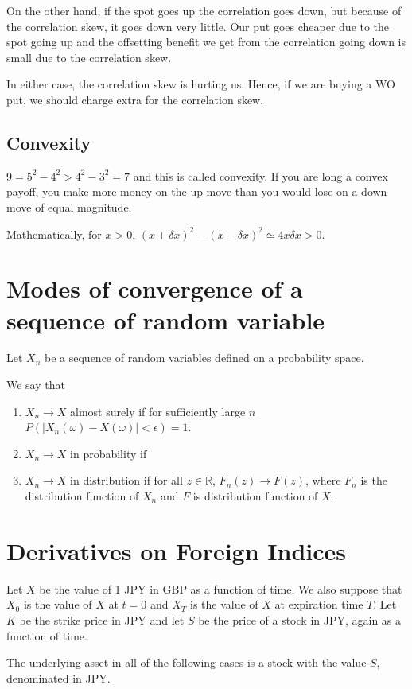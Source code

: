\documentclass{amsart}
\theoremstyle{plain}
\numberwithin{equation}{section}
\begin{document}
On the other hand, if the spot goes up the correlation 
goes down, but because of the correlation skew,
it goes down very little. Our put goes cheaper due to 
the spot going up and the offsetting 
benefit we get from the correlation going down
is small due to the correlation skew.

In either case, the correlation skew is hurting us.
Hence, if we are buying a WO put, we should
charge extra for the correlation skew.
\subsection{Convexity}
$9 = 5^2-4^2 > 4^2 - 3^2 = 7$ and this is called convexity.
If you are long a convex payoff, you make more money 
on the up move than you would lose on a down move of equal magnitude.

Mathematically, for $x>0$,
$(x+\delta x)^2 - (x - \delta x )^2 \simeq 4x\delta x > 0$.

\section*{Modes of convergence of a sequence of random variable}
Let $X_n$ be a sequence of random variables defined on a probability 
space. 

We say that 
\begin{enumerate}
\item $X_n \to X$ almost surely 
if for sufficiently large $n$
$P(|X_n(\omega)-X(\omega)| < \epsilon) = 1$.
\item $X_n \to X$ in probability 
if 

\item $X_n \to X$ in distribution
if for all $z \in \mathbb{R}$, 
$F_n(z) \to F(z)$, where
$F_n$ is the distribution function of 
$X_n$ and $F$ is distribution function 
of $X$.
\end{enumerate}

\section*{Derivatives on Foreign Indices}
Let $X$ be the value of 1 JPY in GBP as
a function of time. We also suppose that 
$X_0$ is the value of $X$ at $t=0$ and 
$X_T$ is the value of $X$ at expiration time $T$.
Let $K$ be the strike price in JPY and 
let $S$ be the price of a stock in JPY, again
as a function of time. 

The underlying asset in all of the following cases
is a stock with the value $S$, denominated in JPY. 
\end{document}
